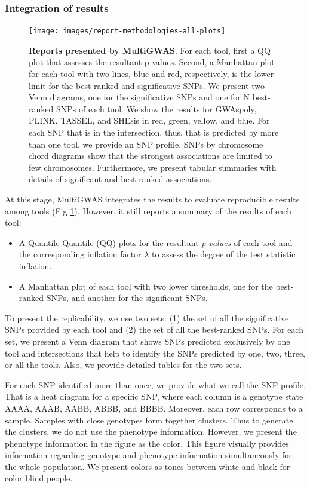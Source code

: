 \documentclass{article}
\begin{document}
\subsubsection{Integration of results}
\begin{figure}
\texttt{[image: images/report-methodologies-all-plots]} \caption{\textbf{Reports presented by MultiGWAS}. For each tool, first a QQ plot that assesses the resultant p-values. Second, a Manhattan plot for each tool with two lines, blue and red, respectively, is the lower limit for the best ranked and significative SNPs. We present two Venn diagrams, one for the significative SNPs and one for N best-ranked SNPs of each tool. We show the results for GWAspoly, PLINK, TASSEL, and SHEsis in red, green, yellow, and blue. For each SNP that is in the intersection, thus, that is predicted by more than one tool, we provide an SNP profile. SNPs by chromosome chord diagrams show that the strongest associations are limited to few chromosomes. Furthermore, we present tabular summaries with details of significant and best-ranked associations.\label{fig:Reports} }
\end{figure}
At this stage, MultiGWAS integrates the results to evaluate reproducible results among tools (Fig \ref{fig:Reports}). However, it still reports a summary of the results of each tool: 
\begin{itemize}
\item A Quantile-Quantile (QQ) plots for the resultant \emph{p-values} of each tool and the corresponding inflation factor $\lambda$ to assess the degree of the test statistic inflation. 
\item A Manhattan plot of each tool with two lower thresholds, one for the best-ranked SNPs, and another for the significant SNPs. 
\end{itemize}
To present the replicability, we use two sets: (1) the set of all the significative SNPs provided by each tool and (2) the set of all the best-ranked SNPs. For each set, we present a Venn diagram that shows SNPs predicted exclusively by one tool and intersections that help to identify the SNPs predicted by one, two, three, or all the tools. Also, we provide detailed tables for the two sets.

For each SNP identified more than once, we provide what we call the SNP profile. That is a heat diagram for a specific SNP, where each column is a genotype state AAAA, AAAB, AABB, ABBB, and BBBB. Moreover, each row corresponds to a sample. Samples with close genotypes form together clusters. Thus to generate the clusters, we do not use the phenotype information. However, we present the phenotype information in the figure as the color. This figure visually provides information regarding genotype and phenotype information simultaneously for the whole population. We present colors as tones between white and black for color blind people.
\end{document}
